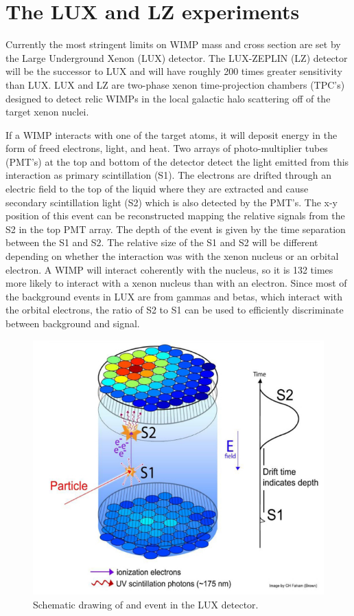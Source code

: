 \chapter{The LUX and LZ experiments}
Currently the most stringent limits on WIMP mass and cross section are set by the Large Underground Xenon (LUX) detector. The LUX-ZEPLIN (LZ) detector will be the successor to LUX and will have roughly 200 times greater sensitivity than LUX. LUX and LZ are two-phase xenon time-projection chambers (TPC's) designed to detect relic WIMPs in the local galactic halo scattering off of the target xenon nuclei. 

If a WIMP interacts with one of the target atoms, it will deposit energy in the form of freed electrons, light, and heat. Two arrays of photo-multiplier tubes (PMT's) at the top and bottom of the detector detect the light emitted from this interaction as primary scintillation (S1). The electrons are drifted through an electric field to the top of the liquid where they are extracted and cause secondary scintillation light (S2) which is also detected by the PMT's. The x-y position of this event can be reconstructed mapping the relative signals from the S2 in the top PMT array. The depth of the event is given by the time separation between the S1 and S2. The relative size of the S1 and S2 will be different depending on whether the interaction was with the xenon nucleus or an orbital electron. A WIMP will interact coherently with the nucleus, so it is 132 times more likely to interact with a xenon nucleus than with an electron. Since most of the background events in LUX are from gammas and betas, which interact with the orbital electrons, the ratio of S2 to S1 can be used to efficiently discriminate between background and signal.

\begin{figure}[h!]
\centering
\includegraphics[width=150mm]{Figures/luxevent.png}
\caption{Schematic drawing of and event in the LUX detector.\cite{lux2012}}
\label{fig:lux} 
\end{figure}

